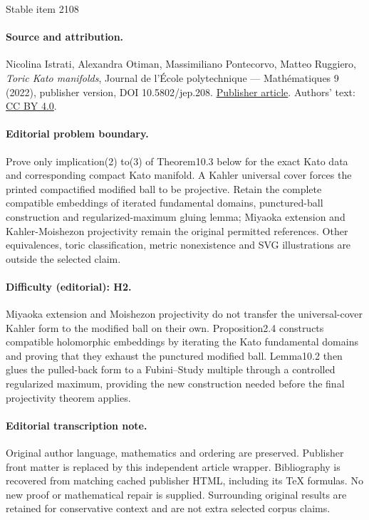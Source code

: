 \documentclass[11pt]{article}
\theoremstyle{definition}
\begin{document}
\begin{center}{\Large Stable item 2108}\end{center}
\paragraph{Source and attribution.}
Nicolina Istrati, Alexandra Otiman, Massimiliano Pontecorvo, Matteo Ruggiero, \emph{Toric Kato manifolds}, Journal de l’École polytechnique — Mathématiques 9 (2022), publisher version, DOI 10.5802/jep.208. \href{https://jep.centre-mersenne.org/articles/10.5802/jep.208/}{Publisher article}. Authors' text: \href{https://creativecommons.org/licenses/by/4.0/}{CC BY 4.0}.
\paragraph{Editorial problem boundary.}
Prove only implication(2) to(3) of Theorem10.3 below for the exact Kato data and corresponding compact Kato manifold. A Kahler universal cover forces the printed compactified modified ball to be projective. Retain the complete compatible embeddings of iterated fundamental domains, punctured-ball construction and regularized-maximum gluing lemma; Miyaoka extension and Kahler-Moishezon projectivity remain the original permitted references. Other equivalences, toric classification, metric nonexistence and SVG illustrations are outside the selected claim.
\paragraph{Difficulty (editorial): H2.}
Miyaoka extension and Moishezon projectivity do not transfer the universal-cover Kahler form to the modified ball on their own. Proposition2.4 constructs compatible holomorphic embeddings by iterating the Kato fundamental domains and proving that they exhaust the punctured modified ball. Lemma10.2 then glues the pulled-back form to a Fubini–Study multiple through a controlled regularized maximum, providing the new construction needed before the final projectivity theorem applies.
\paragraph{Editorial transcription note.}
Original author language, mathematics and ordering are preserved. Publisher front matter is replaced by this independent article wrapper. Bibliography is recovered from matching cached publisher HTML, including its TeX formulas. No new proof or mathematical repair is supplied. Surrounding original results are retained for conservative context and are not extra selected corpus claims.
\clearpage
\end{document}
